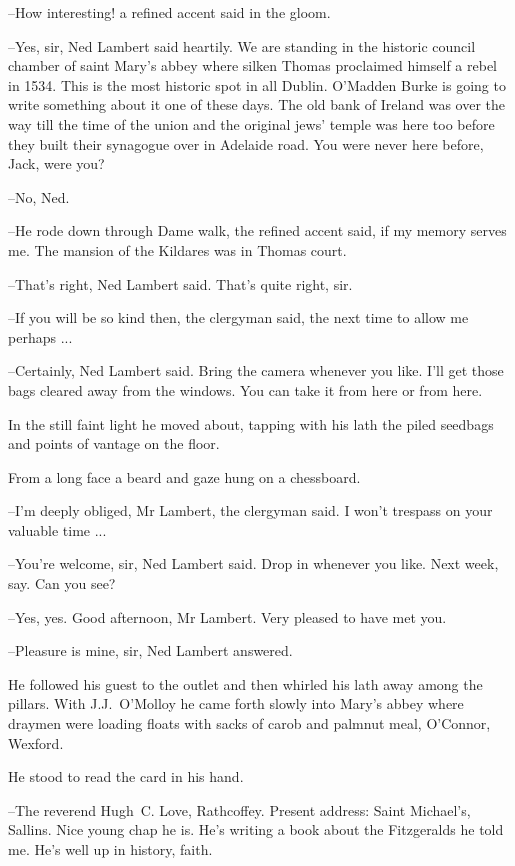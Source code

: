 --How interesting! a refined accent said in the gloom.

--Yes, sir, Ned Lambert said heartily. We are standing in the historic
council chamber of saint Mary's abbey where silken Thomas proclaimed
himself a rebel in 1534. This is the most historic spot in all Dublin.
O'Madden Burke is going to write something about it
one of these days.
The old bank of Ireland was over the way till the time of the union and the
original jews' temple was here too before they built their synagogue over
in Adelaide road. You were never here before, Jack, were you?

--No, Ned.

--He rode down through Dame walk, the refined accent said, if my
memory serves me. The mansion of the Kildares was in Thomas court.

--That's right, Ned Lambert said. That's quite right, sir.

--If you will be so kind then, the clergyman said, the next time to allow
me perhaps ...

--Certainly, Ned Lambert said.
Bring the camera whenever you like.
I'll get those bags cleared away from the windows.
You can take it from here or from here.

In the still faint light he moved about, tapping with his lath the piled
seedbags and points of vantage on the floor.

From a long face a beard and gaze hung on a chessboard.

--I'm deeply obliged, Mr Lambert, the clergyman said. I won't trespass on
your valuable time ...

--You're welcome, sir, Ned Lambert said. Drop in whenever you like. Next
week, say. Can you see?

--Yes, yes.
Good afternoon, Mr Lambert.
Very pleased to have met you.

--Pleasure is mine, sir, Ned Lambert answered.

He followed his guest to the outlet and then whirled his lath away
among the pillars. With J.J.~O'Molloy he came forth slowly into Mary's
abbey where draymen were loading floats with sacks of carob and palmnut
meal, O'Connor, Wexford.

He stood to read the card in his hand.

--The reverend Hugh~C. Love, Rathcoffey.
Present address: Saint Michael's, Sallins.
Nice young chap he is.
He's writing a book about the Fitzgeralds he told me.
He's well up in history, faith.

